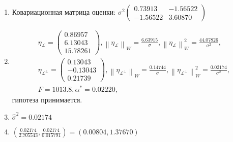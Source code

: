 \documentclass[a4paper,12pt]{article}
\newcommand{\norm}[1]{\left \| #1 \right \|}
\newcommand{\pr}[2]{#1_\mathcal{#2}}
\newcommand{\pro}[2]{#1_{\mathcal{#2}^\perp}}
\begin{document}
\begin{enumerate}
\begin{enumerate}
                  \item Ковариационная матрица оценки:
                        $
                              \sigma^2
                              \begin{pmatrix}
                                    0.73913  & -1.56522 \\
                                    -1.56522 & 3.60870
                              \end{pmatrix}
                        $

                  \item
                        \begin{gather*}
                              \pr{\eta}{L} =
                              \begin{pmatrix}
                                    0.86957 \\
                                    6.13043 \\
                                    15.78261
                              \end{pmatrix},
                              \norm{\pr{\eta}{L}}_W = \frac{6.63915}{\sigma} ,
                              \norm{\pr{\eta}{L}}_W^2 = \frac{44.07826}{\sigma^2} , \\
                              \pro{\eta}{L} =
                              \begin{pmatrix}
                                    0.13043  \\
                                    -0.13043 \\
                                    0.21739
                              \end{pmatrix} ,
                              \norm{\pro{\eta}{L}}_W = \frac{0.14744}{\sigma} ,
                              \norm{\pro{\eta}{L}}_W^2 = \frac{0.02174}{\sigma^2} , \\
                              F = 1013.8, \alpha^* = 0.02220,
                        \end{gather*}
                        гипотеза принимается.
                  \item $\widehat{\sigma}^2 = 0.02174$
                  \item $\left( \frac{0.02174}{2.705543}, \frac{0.02174}{0.015791} \right) = \left( 0.00804, 1.37670 \right)$
            \end{enumerate}
\end{enumerate}
\end{document}
